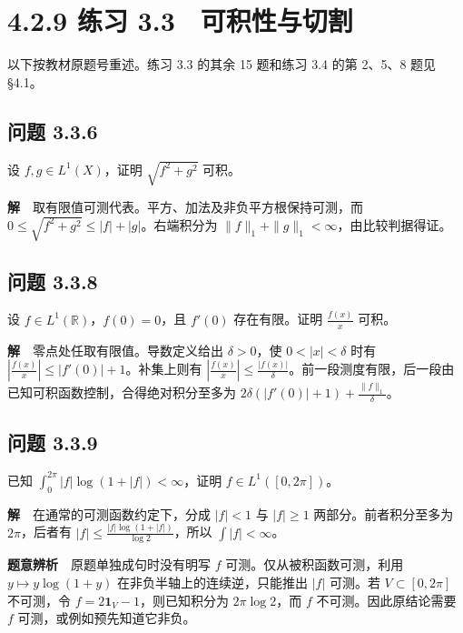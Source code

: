 \documentclass[11pt,a4paper]{article}
\begin{document}
\clearpage\section[\S{}4.2.9 练习
3.3　可积性与切割]{4.2.9 练习
3.3　可积性与切割}\label{ux7ec3ux4e60-3.3-ux53efux79efux6027ux4e0eux5207ux5272}

以下按教材原题号重述。练习 3.3 的其余 15 题和练习 3.4 的第 2、5、8 题见
§4.1。

\subsection{问题 3.3.6}\label{ux95eeux9898-3.3.6}

设 \(f,g\in L^1(X)\)，证明 \(\sqrt{f^2+g^2}\) 可积。

\textbf{解}　取有限值可测代表。平方、加法及非负平方根保持可测，而
\(0\le\sqrt{f^2+g^2}\le|f|+|g|\)。右端积分为
\(\|f\|_1+\|g\|_1<\infty\)，由比较判据得证。

\subsection{问题 3.3.8}\label{ux95eeux9898-3.3.8}

设 \(f\in L^1(\mathbb R)\)，\(f(0)=0\)，且 \(f'(0)\) 存在有限。证明
\(\frac{f(x)}{x}\) 可积。

\textbf{解}　零点处任取有限值。导数定义给出 \(\delta>0\)，使
\(0<|x|<\delta\) 时有 \(|\frac{f(x)}{x}|\le |f'(0)|+1\)。补集上则有
\(|\frac{f(x)}{x}|\le \frac{|f(x)|}{\delta}\)。前一段测度有限，后一段由已知可积函数控制，合得绝对积分至多为
\(2\delta(|f'(0)|+1)+\frac{\|f\|_1}{\delta}\)。

\subsection{问题 3.3.9}\label{ux95eeux9898-3.3.9}

已知 \(\int_0^{2\pi}|f|\log(1+|f|)<\infty\)，证明
\(f\in L^1([0,2\pi])\)。

\textbf{解}　在通常的可测函数约定下，分成 \(|f|<1\) 与 \(|f|\ge1\)
两部分。前者积分至多为 \(2\pi\)，后者有
\(|f|\le \frac{|f|\log(1+|f|)}{\log 2}\)，所以 \(\int|f|<\infty\)。

\textbf{题意辨析}　原题单独成句时没有明写 \(f\)
可测。仅从被积函数可测，利用 \(y\mapsto y\log(1+y)\)
在非负半轴上的连续逆，只能推出 \(|f|\) 可测。若 \(V\subset[0,2\pi]\)
不可测，令 \(f=2\mathbf1_V-1\)，则已知积分为 \(2\pi\log 2\)，而 \(f\)
不可测。因此原结论需要 \(f\) 可测，或例如预先知道它非负。
\end{document}

